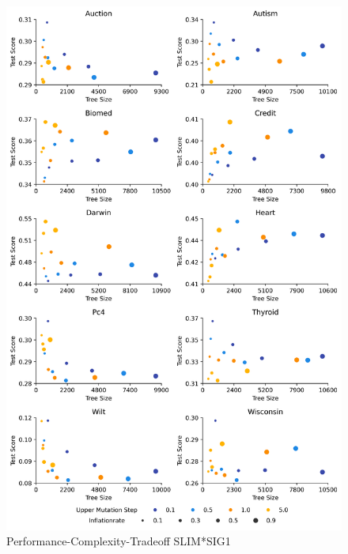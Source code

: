 
    \begin{figure}[H]
    \centering
    \includegraphics[width=\linewidth]{../Latex/Chapters/Figures/Results/RQ_Inflationrate_performance_complexity_tradeoff_mulsig1.png}
    \caption{Performance-Complexity-Tradeoff SLIM*SIG1}
    \label{fig:RQ_Inflationrate_performance_complexity_tradeoff_mulsig1}
    \end{figure}
    